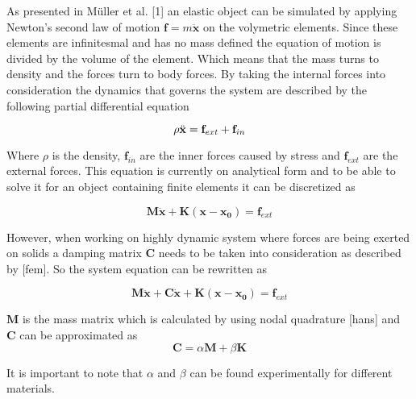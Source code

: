 As presented in M\"uller et al. [1] an elastic object can be simulated by applying Newton's second law of motion $\mathbf{f} = m\ddot{\mathbf{x}}$ on the volymetric elements. Since these elements are infinitesmal and has no mass defined the equation of motion is divided by the volume of the element. Which means that the mass turns to density and the forces turn to body forces. By taking the internal forces into consideration the dynamics that governs the system are described by the following partial differential equation  

\begin{equation}\label{eqn:contPDE}
    \rho \ddot{\bf x} ={\mathbf f}_{ext} + {\mathbf f}_{in}
\end{equation}

Where $\rho$ is the density, ${\mathbf f}_{in}$ are the inner forces caused by stress and ${\mathbf f}_{ext}$ are the external forces. This equation is currently on analytical form and to be able to solve it for an object containing finite elements it can be discretized as

\begin{equation}\label{eqn:discPDE}
\mathbf{M\ddot{x}} + \mathbf{K(x- x_0)} =  \mathbf{f}_{ext}
\end{equation}

However, when working on highly dynamic system where forces are being exerted on solids a damping matrix $\mathbf{C}$ needs to be taken into consideration as described by [fem]. So the system equation can be rewritten as

\begin{equation}\label{eqn:fullDiscPDE}
\mathbf{M\ddot{x}} + \mathbf{C\dot{x}} + \mathbf{K(x-x_0)} =  \mathbf{f}_{ext}
\end{equation}

$\mathbf{M}$ is the mass matrix which is calculated by using nodal quadrature [hans] and $\mathbf{C}$ can be approximated as
\begin{equation}\label{eqn:BuildC}
\mathbf{\mathbf{C}} = \alpha \mathbf{M} + \beta \mathbf{K}
\end{equation}

It is important to note that $\alpha$ and $\beta$ can be found experimentally for different materials.
